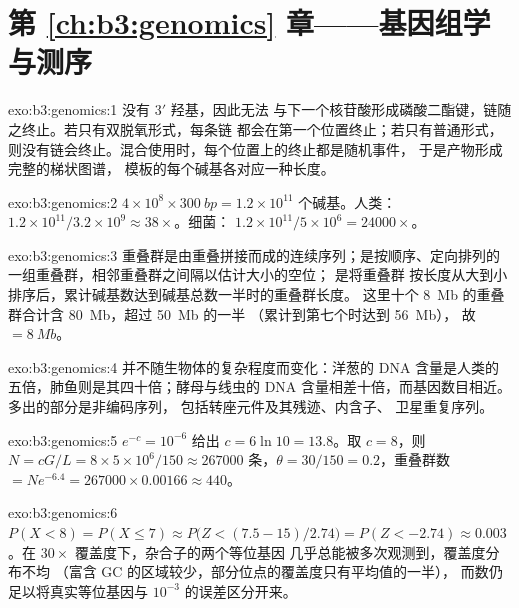 \section*{第 \ref{ch:b3:genomics} 章——基因组学与测序}

\begin{solution}{exo:b3:genomics:1}
没有 3$'$ 羟基，因此无法
与下一个核苷酸形成磷酸二酯键，链随之终止。若只有双脱氧形式，每条链
都会在第一个位置终止；若只有普通形式，
则没有链会终止。混合使用时，每个位置上的终止都是随机事件，
于是产物形成完整的梯状图谱，
模板的每个碱基各对应一种长度。
\end{solution}

\begin{solution}{exo:b3:genomics:2}
$4\times 10^{8}\times \qty{300}{bp} = 1.2\times 10^{11}$ 个碱基。人类：
$1.2\times 10^{11}/3.2\times 10^{9} \approx 38\times$。细菌：
$1.2\times 10^{11}/5\times 10^{6} = \num{24000}\times$。
\end{solution}

\begin{solution}{exo:b3:genomics:3}
重叠群是由重叠拼接而成的连续序列；是按顺序、定向排列的
一组重叠群，相邻重叠群之间隔以估计大小的空位； 是将重叠群
按长度从大到小排序后，累计碱基数达到碱基总数一半时的重叠群长度。
这里十个 \qty{8}{Mb} 的重叠群合计含 \qty{80}{Mb}，超过 \qty{50}{Mb} 的一半
（累计到第七个时达到 \qty{56}{Mb}），
故  $= \qty{8}{Mb}$。
\end{solution}

\begin{solution}{exo:b3:genomics:4}
并不随生物体的复杂程度而变化：洋葱的 DNA
含量是人类的五倍，肺鱼则是其四十倍；酵母与线虫的 DNA
含量相差十倍，而基因数目相近。多出的部分是非编码序列，
包括转座元件及其残迹、内含子、
卫星重复序列。
\end{solution}

\begin{solution}{exo:b3:genomics:5}
$e^{-c} = 10^{-6}$ 给出 $c = 6\ln 10 = 13.8$。取 $c = 8$，则 $N =
cG/L = 8\times 5\times 10^{6}/150 \approx \num{267000}$ 条，$\theta
= 30/150 = 0.2$，重叠群数 $= N e^{-6.4} = \num{267000}\times 0.00166
\approx 440$。
\end{solution}

\begin{solution}{exo:b3:genomics:6}
$P(X < 8) = P(X \le 7) \approx P\bigl(Z < (7.5 - 15)/2.74\bigr) =
P(Z < -2.74) \approx 0.003$。在 $30\times$ 覆盖度下，杂合子的两个等位基因
几乎总能被多次观测到，覆盖度分布不均
（富含 GC 的区域较少，部分位点的覆盖度只有平均值的一半），
而数仍足以将真实等位基因与 $10^{-3}$
的误差区分开来。
\end{solution}

